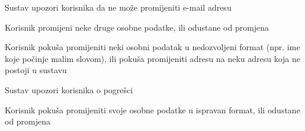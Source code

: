 \begin{packed_item}
\begin{packed_item}
\begin{packed_enum}
								\item Sustav upozori korisnika da ne može promijeniti e-mail adresu
								\item Korisnik promijeni neke druge osobne podatke, ili odustane od promjena
								
							\end{packed_enum}
							
							\item[2.c] Korisnik pokuša promijeniti neki osobni podatak u nedozvoljeni format (npr. ime koje počinje malim slovom), ili pokuša promijeniti adresu na neku adresu koja ne postoji u sustavu
							\item[] \begin{packed_enum}
								
								\item Sustav upozori korisnika o pogrešci
								\item Korisnik pokuša promijeniti svoje osobne podatke u ispravan format, ili odustane od promjena
								
							\end{packed_enum}
							
						\end{packed_item}
					\end{packed_item}
					
